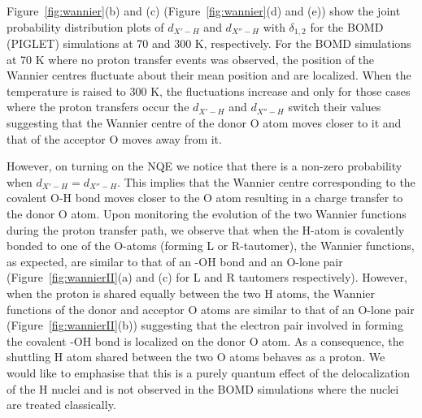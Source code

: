 Figure~\ref{fig:wannier}(b) and (c) (Figure~\ref{fig:wannier}(d) and (e))
show the joint probability distribution 
plots of $d_{X'-H}$ and $d_{X''-H}$ with $\delta_{1,2}$ for the BOMD (PIGLET) 
simulations at 70 and 300 K, respectively. For the BOMD simulations at 70 K where no proton transfer events was observed, the position of the Wannier centres
fluctuate about their mean position and are localized.  When the temperature is raised to 300 K, the fluctuations increase and only for those cases where the proton transfers occur the $d_{X'-H}$ and $d_{X''-H}$ switch their values
suggesting that the Wannier centre of the donor O atom moves closer to it
and that of the acceptor O moves away from it. 
 

However, on turning on the NQE we notice
that there is a non-zero probability when $d_{X'-H} = d_{X''-H}$. This implies that the Wannier centre
corresponding to the covalent O-H bond moves closer to the O atom resulting in a charge
transfer to the donor O atom. Upon monitoring the evolution of the two Wannier
functions during the proton transfer path, we observe that when the H-atom
is covalently bonded to one of the O-atoms (forming L or R-tautomer),
the Wannier functions, as expected, are similar to that of an -OH bond and an O-lone pair (Figure~\ref{fig:wannierII}(a) and (c) for L and R tautomers respectively). However, when the proton is shared equally between the two H atoms, the Wannier functions of the donor and acceptor O atoms are similar to that of an O-lone pair
(Figure~\ref{fig:wannierII}(b)) suggesting that the electron pair
involved in forming the covalent -OH bond is localized on the donor
O atom. As a consequence, the shuttling H atom shared between
the two O atoms behaves as a proton. We would like to emphasise that this is a purely quantum effect of the delocalization of the H nuclei and is not observed in the BOMD simulations where the nuclei are treated classically.

